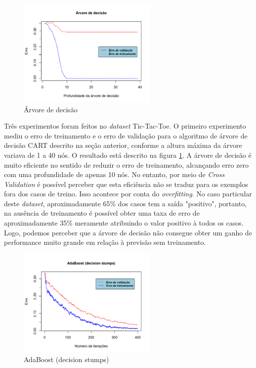 \documentclass{article}
\begin{document}
\begin{figure}
  \center
  \includegraphics[width=256px]{decision_tree.png}
  \caption{Árvore de decisão}
  \label{fig:decision_tree}
\end{figure}

Três experimentos foram feitos no \textit{dataset} Tic-Tac-Toe. O primeiro
experimento mediu o erro de treinamento e o erro de validação para o algoritmo de árvore de decisão
CART descrito na seção anterior, conforme a altura máxima da árvore variava de 1 a 40 nós. O
resultado está descrito na figura \ref{fig:decision_tree}. A árvore de decisão é muito eficiente no
sentido de reduzir o erro de treinamento, alcançando erro zero com uma profundidade de apenas 10
nós. No entanto, por meio de \textit{Cross Validation} é possível
perceber que esta eficiência não se traduz para os exemplos fora dos casos de treino. 
Isso acontece por conta do \textit{overfitting}. No caso particular deste \textit{dataset}, aproximadamente
65\% dos casos tem a saída "positivo", portanto, na ausência de treinamento é possível obter uma
taxa de erro de aproximadamente 35\% meramente atribuindo o valor positivo à todos os casos. Logo,
podemos perceber que a árvore de decisão não consegue obter um ganho de performance muito grande em
relação à previsão sem treinamento.

\begin{figure}
  \center
  \includegraphics[width=256px]{adaboost.png}
  \caption{AdaBoost (decision stumps)}
  \label{fig:adaboost}
\end{figure}
\end{document}
